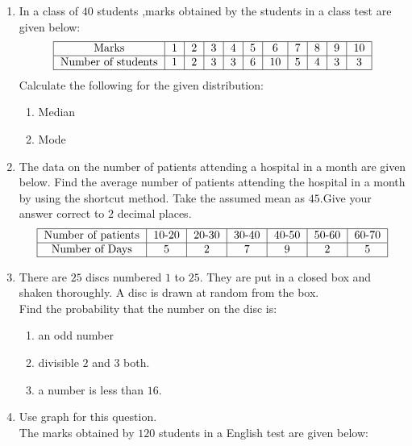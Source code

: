 
\begin{enumerate}

\item In a class of $40$ students ,marks obtained by the students in a class test  are given below:
	\begin{align*}
       \begin{tabular}{|c|c|c|c|c|c|c|c|c|c|c|}
\hline
	       Marks& 1 & 2 & 3 & 4 & 5 & 6 & 7 & 8 & 9 & 10\\
\hline
	       Number of students & 1 & 2 & 3 & 3 & 6 & 10 & 5 & 4 & 3 & 3\\
\hline
       \end{tabular}
	\end{align*}
\text Calculate the following for the given distribution:
		\begin{enumerate}
        \item Median
		\item Mode
		\end{enumerate}


\item The data on the number of patients attending a hospital in a month are given below.
Find the average  number of patients attending the hospital in a month by using the shortcut method.
Take the assumed mean as $45$.Give your answer correct to $2$ decimal places.
		\begin{align*}
\begin{tabular}{|c|c|c|c|c|c|c|}
\hline
	       Number of patients& 10-20 & 20-30 & 30-40 & 40-50 & 50-60 & 60-70\\
\hline
	       Number of Days & 5 & 2 & 7 & 9 & 2 & 5\\
\hline
       \end{tabular}
		\end{align*}
\item There are $25$ discs numbered $1$ to $25$. They are put in a closed box and shaken thoroughly. A disc is drawn at random from the box.\\
Find the probability that the number on the disc is:
\begin{enumerate}
    \item an odd number
    \item divisible $2$ and $3$ both.
    \item a number is less than $16$.
\end{enumerate}

\item Use graph for this question.\\
The marks obtained by $120$ students in a English test are given below:
			

\end{enumerate}
